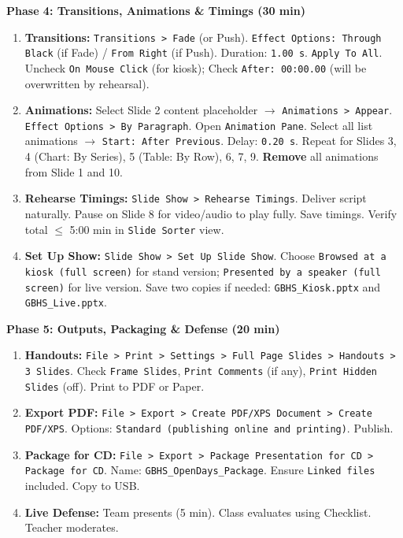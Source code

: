 \documentclass[11pt]{article}
\begin{document}
\textbf{Phase 4: Transitions, Animations \& Timings (30 min)}
\begin{enumerate}[resume]
    \item \textbf{Transitions:} \texttt{Transitions > Fade} (or Push). \texttt{Effect Options: Through Black} (if Fade) / \texttt{From Right} (if Push). Duration: \texttt{1.00 s}. \texttt{Apply To All}. Uncheck \texttt{On Mouse Click} (for kiosk); Check \texttt{After: 00:00.00} (will be overwritten by rehearsal).
    \item \textbf{Animations:} Select Slide 2 content placeholder $\rightarrow$ \texttt{Animations > Appear}. \texttt{Effect Options > By Paragraph}. Open \texttt{Animation Pane}. Select all list animations $\rightarrow$ \texttt{Start: After Previous}. Delay: \texttt{0.20 s}. Repeat for Slides 3, 4 (Chart: By Series), 5 (Table: By Row), 6, 7, 9. \textbf{Remove} all animations from Slide 1 and 10.
    \item \textbf{Rehearse Timings:} \texttt{Slide Show > Rehearse Timings}. Deliver script naturally. Pause on Slide 8 for video/audio to play fully. Save timings. Verify total $\le$ 5:00 min in \texttt{Slide Sorter} view.
    \item \textbf{Set Up Show:} \texttt{Slide Show > Set Up Slide Show}. Choose \texttt{Browsed at a kiosk (full screen)} for stand version; \texttt{Presented by a speaker (full screen)} for live version. Save two copies if needed: \texttt{GBHS\_Kiosk.pptx} and \texttt{GBHS\_Live.pptx}.
\end{enumerate}

\textbf{Phase 5: Outputs, Packaging \& Defense (20 min)}
\begin{enumerate}[resume]
    \item \textbf{Handouts:} \texttt{File > Print > Settings > Full Page Slides > Handouts > 3 Slides}. Check \texttt{Frame Slides}, \texttt{Print Comments} (if any), \texttt{Print Hidden Slides} (off). Print to PDF or Paper.
    \item \textbf{Export PDF:} \texttt{File > Export > Create PDF/XPS Document > Create PDF/XPS}. Options: \texttt{Standard (publishing online and printing)}. Publish.
    \item \textbf{Package for CD:} \texttt{File > Export > Package Presentation for CD > Package for CD}. Name: \texttt{GBHS\_OpenDays\_Package}. Ensure \texttt{Linked files} included. Copy to USB.
    \item \textbf{Live Defense:} Team presents (5 min). Class evaluates using Checklist. Teacher moderates.
\end{enumerate}
\end{document}
